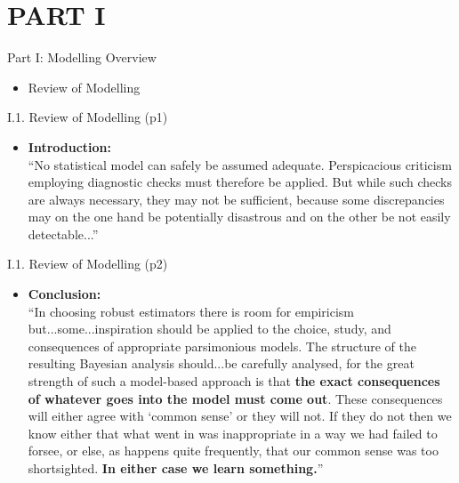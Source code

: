 \documentclass[handout]{beamer}
\newcommand{\strong}[1]{\textbf{\color{teal} #1}}
\begin{document}
\section{PART I}
\begin{frame}{Part I: Modelling Overview}
\begin{itemize}
\item[I.1.] Review of Modelling
\end{itemize}
\end{frame}
\begin{frame}{I.1. Review of Modelling (p1)}
\begin{itemize}
\item \strong{Introduction:}\\
``No statistical model can safely be assumed adequate. Perspicacious criticism employing diagnostic checks must therefore be applied. But while such checks are always necessary, they may not be sufficient, because some discrepancies may on the one hand be potentially disastrous and on the other be not easily detectable...''~\cite{Box:1980}
\end{itemize}
\end{frame}
\begin{frame}{I.1. Review of Modelling (p2)}
\begin{itemize}
\item \strong{Conclusion:}\\
``In choosing robust estimators there is room for empiricism but...some...inspiration should be applied to the choice, study, and consequences of appropriate parsimonious models. The structure of the resulting Bayesian analysis should...be carefully analysed, for the great strength of such a model-based approach is that \textbf{the exact consequences of whatever goes into the model must come out}. These consequences will either agree with `common sense' or they will not. If they do not then we know either that what went in was inappropriate in a way we had failed to forsee, or else, as happens quite frequently, that our common sense was too shortsighted. 
\textbf{In either case we learn something.}''~\cite{Box:1980}
\end{itemize}
\end{frame}
\end{document}
